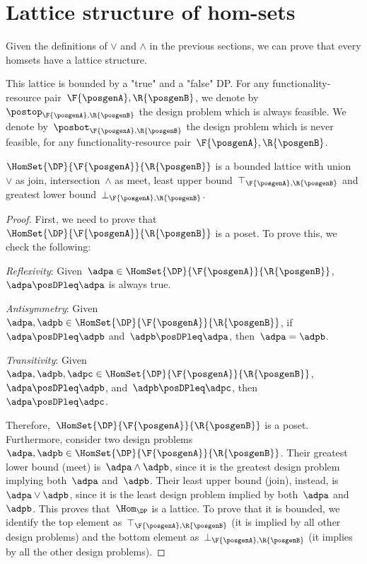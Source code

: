 \section{Lattice structure of \DP hom-sets}

Given the definitions of $\vee$ and $\wedge$ in the previous sections, we can prove that
every \DP homsets have a lattice structure.

This lattice is bounded by a "true" and a "false" DP.
For any functionality-resource pair~$\F{\posgenA},\R{\posgenB}$, we denote by~$\postop_{\F{\posgenA},\R{\posgenB}}$ the design problem which is always feasible.
We denote by~$\posbot_{\F{\posgenA},\R{\posgenB}}$ the design problem which is never feasible, for any functionality-resource pair~$\F{\posgenA},\R{\posgenB}$.

\begin{lemma}
    \label{lem:dpboundedlattice}
    $\HomSet{\DP}{\F{\posgenA}}{\R{\posgenB}}$ is a bounded lattice with union~$\vee$ as join, intersection~$\wedge$ as meet, least upper bound~$\top_{\F{\posgenA},\R{\posgenB}}$ and greatest lower bound~$\bot_{\F{\posgenA},\R{\posgenB}}$.
\end{lemma}

\begin{proof}
    First, we need to prove that~$\HomSet{\DP}{\F{\posgenA}}{\R{\posgenB}}$ is a poset.
    To prove this, we check the following:
%
    \begin{compactitem}
        \item \emph{Reflexivity}: Given~$\adpa\in \HomSet{\DP}{\F{\posgenA}}{\R{\posgenB}}$,~$\adpa\posDPleq \adpa$ is always true.
        \item \emph{Antisymmetry}: Given~$\adpa,\adpb\in \HomSet{\DP}{\F{\posgenA}}{\R{\posgenB}}$, if~$\adpa\posDPleq \adpb$ and~$\adpb\posDPleq \adpa$, then~$\adpa=\adpb$.
        \item \emph{Transitivity}: Given~$\adpa,\adpb,\adpc\in \HomSet{\DP}{\F{\posgenA}}{\R{\posgenB}}$,~$\adpa\posDPleq \adpb$, and~$\adpb\posDPleq \adpc$, then~$\adpa\posDPleq \adpc$.
    \end{compactitem}
    Therefore,~$\HomSet{\DP}{\F{\posgenA}}{\R{\posgenB}}$ is a poset.
    Furthermore, consider two design problems~$\adpa,\adpb\in \HomSet{\DP}{\F{\posgenA}}{\R{\posgenB}}$.
    Their greatest lower bound (meet) is~$\adpa\wedge \adpb$, since it is the greatest design problem implying both~$\adpa$ and~$\adpb$.
    Their least upper bound (join), instead, is~$\adpa\vee \adpb$, since it is the least design problem implied by both~$\adpa$ and~$\adpb$.
    This proves that~$\Hom_\DP$ is a lattice.
    To prove that it is bounded, we identify the top element as~$\top_{\F{\posgenA},\R{\posgenB}}$ (it is implied by all other design problems) and the bottom element as~$\bot_{\F{\posgenA},\R{\posgenB}}$ (it implies by all the other design problems).
\end{proof}

